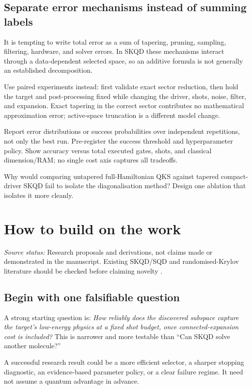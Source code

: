 \documentclass[11pt,a4paper,oneside]{report}
\newcommand{\src}[1]{\par{\small\color{grey}\textit{Source status:} #1}\par}
\newcommand{\checkpoint}[1]{\begin{idea}[Check your understanding]#1\end{idea}}
\begin{document}
\section{Separate error mechanisms instead of summing labels}
It is tempting to write total error as a sum of tapering, pruning, sampling, filtering, hardware, and solver errors. In SKQD these mechanisms interact through a data-dependent selected space, so an additive formula is not generally an established decomposition.

Use paired experiments instead: first validate exact sector reduction, then hold the target and post-processing fixed while changing the driver, shots, noise, filter, and expansion. Exact tapering in the correct sector contributes no mathematical approximation error; active-space truncation is a different model change.

Report error distributions or success probabilities over independent repetitions, not only the best run. Pre-register the success threshold and hyperparameter policy. Show accuracy versus total executed gates, shots, and classical dimension/RAM; no single cost axis captures all tradeoffs.

\checkpoint{Why would comparing untapered full-Hamiltonian QKS against tapered compact-driver SKQD fail to isolate the diagonalisation method? Design one ablation that isolates it more cleanly.}

\chapter{How to build on the work}\label{ch:research}
\src{Research proposals and derivations, not claims made or demonstrated in the manuscript. Existing SKQD/SQD and randomised-Krylov literature should be checked before claiming novelty \cite{yu,robledo,piccinelli}.}

\section{Begin with one falsifiable question}
A strong starting question is: \emph{How reliably does the discovered subspace capture the target's low-energy physics at a fixed shot budget, once connected-expansion cost is included?} This is narrower and more testable than ``Can SKQD solve another molecule?''

A successful research result could be a more efficient selector, a sharper stopping diagnostic, an evidence-based parameter policy, or a clear failure regime. It need not assume a quantum advantage in advance.
\end{document}
